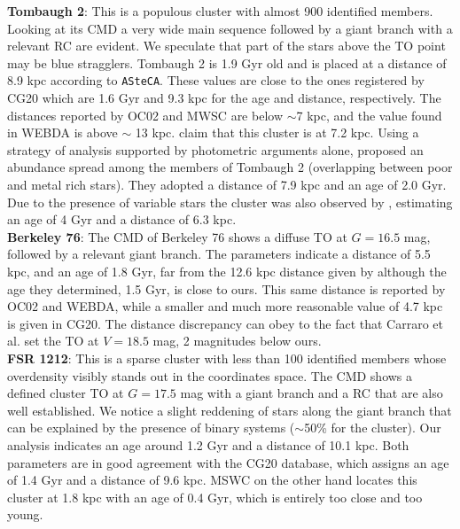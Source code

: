 \documentclass[draft]{aa}
\begin{document}
  \textbf{Tombaugh 2}: This is a populous cluster with almost 900 identified
  members. Looking at its CMD a very wide main sequence followed by a giant
  branch with a relevant RC are evident. We speculate that part of the stars
  above the TO point may be blue stragglers. Tombaugh 2 is 1.9 Gyr old and is
  placed at a distance of 8.9 kpc according to \texttt{ASteCA}. These values are
  close to the ones registered by CG20 which are 1.6 Gyr and 9.3 kpc for the age
  and distance, respectively. The distances reported by OC02 and MWSC are below
  $\sim$7 kpc, and the value found in WEBDA is above $\sim$ 13 kpc.
  \cite{Villanova_2010} claim that this cluster is at 7.2 kpc.
  Using a strategy of analysis supported by photometric arguments alone, 
  \cite{Frinchaboy_2008} proposed an abundance spread among the members of
  Tombaugh 2 (overlapping between poor and metal rich stars). They adopted a
  distance of 7.9 kpc and an age of 2.0 Gyr.
  Due to the presence of variable stars the cluster was also observed by
  \cite{Kubiak_1992}, estimating an age of 4 Gyr and a distance of 6.3 kpc.\\

  \textbf{Berkeley 76}: The CMD of Berkeley 76 shows a diffuse TO at $G=16.5$
  mag, followed by a relevant giant branch. The parameters indicate a distance
  of 5.5 kpc, and an age of 1.8 Gyr, far from the 12.6 kpc distance given
  by \cite{Carraro_2013_Five} although the age they determined, 1.5 Gyr, is
  close to ours. This same distance is reported by OC02 and WEBDA, while a
  smaller and much more reasonable value of 4.7 kpc is given in CG20.
  The distance discrepancy can obey to the fact that Carraro et al. set
  the TO at $V=18.5$ mag, 2 magnitudes below ours.\\

  \textbf{FSR 1212}: This is a sparse cluster with less than 100 identified 
  members whose overdensity visibly stands out in the coordinates space. The CMD
  shows a defined cluster TO at $G=17.5$ mag with a giant branch and a RC that
  are also well established. We notice a slight reddening of stars along the
  giant branch that can be explained by the presence of binary systems 
  ($\sim$50\% for the cluster).
  Our analysis indicates an age around 1.2 Gyr and a distance of 10.1
  kpc. Both parameters are in good agreement with the CG20 database, which
  assigns an age of 1.4 Gyr and a distance of 9.6 kpc. MSWC on the other hand
  locates this cluster at 1.8 kpc with an age of 0.4 Gyr, which is entirely too
  close and too young.\\
\end{document}
